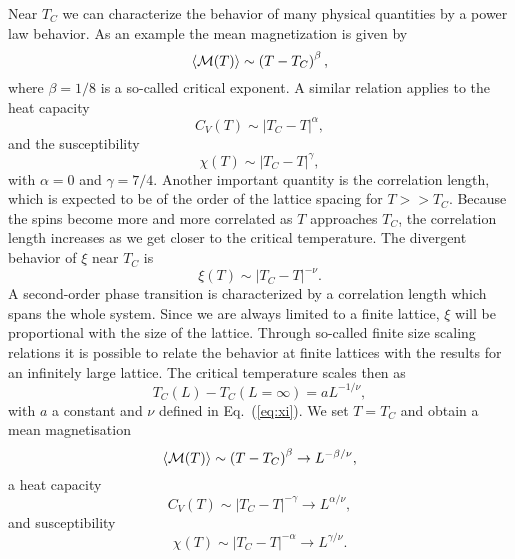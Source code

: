 \documentclass[11pt,a4wide]{article}
\begin{document}
Near $T_C$ we can characterize the behavior of many physical quantities
by a power law behavior.
As an example the mean magnetization is given by
\begin{equation}
  \langle {\cal M}(T) \rangle \sim \left(T-T_C\right)^{\beta},
\end{equation}
where $\beta=1/8$ is a so-called critical exponent. A similar relation
applies to the heat capacity 
\begin{equation}
  C_V(T) \sim \left|T_C-T\right|^{\alpha},
\end{equation}
and the susceptibility
\begin{equation}
  \chi(T) \sim \left|T_C-T\right|^{\gamma},
\end{equation}
with $\alpha = 0$ and $\gamma = 7/4$.
Another important quantity is the correlation length, which is expected
to be of the order of the lattice spacing for $T>> T_C$. Because the spins
become more and more correlated as $T$ approaches $T_C$, the correlation
length increases as we get closer to the critical temperature. The divergent
behavior of $\xi$ near $T_C$ 
is
\begin{equation}
  \xi(T) \sim \left|T_C-T\right|^{-\nu}.
  \label{eq:xi}
\end{equation}
A second-order phase transition is characterized by a
correlation length which spans the whole system.
Since we are always limited to a finite lattice, $\xi$ will
be proportional with the size of the lattice. 
Through so-called finite size scaling relations
it is possible to relate the behavior at finite lattices with the 
results for an infinitely large lattice.
The critical temperature scales then as
\begin{equation}
 T_C(L)-T_C(L=\infty) = aL^{-1/\nu},
 \label{eq:tc}
\end{equation}
with  $a$ a constant and  $\nu$ defined in Eq.~(\ref{eq:xi}).
We set $T=T_C$ and obtain a mean magnetisation
\begin{equation}
  \langle {\cal M}(T) \rangle \sim \left(T-T_C\right)^{\beta}
  \rightarrow L^{-\beta/\nu},
  \label{eq:scale1}
\end{equation}
a heat capacity
\begin{equation}
  C_V(T) \sim \left|T_C-T\right|^{-\gamma} \rightarrow L^{\alpha/\nu},
  \label{eq:scale2}
\end{equation}
and susceptibility
\begin{equation}
  \chi(T) \sim \left|T_C-T\right|^{-\alpha} \rightarrow L^{\gamma/\nu}.
  \label{eq:scale3}
\end{equation}
\end{document}
